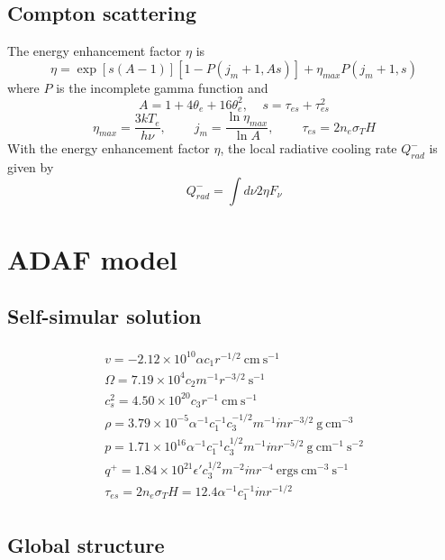 \documentclass[12pt]{book}
\begin{document}
\subsection{Compton scattering}
The energy enhancement factor $\eta$ is
\begin{equation}
 \eta=\exp[s(A-1)][1-P(j_m+1,As)]+\eta_{max}P(j_m+1,s)
\end{equation}
where $P$ is the incomplete gamma function and
\begin{equation}
 A=1+4\theta_e+16\theta_e^2,~~~~~s=\tau_{es}+\tau_{es}^2
\end{equation}
\begin{equation}
 \eta_{max}=\frac{3kT_e}{h\nu},~~~~~~~~~~j_m=\frac{\ln\eta_{max}}{\ln A},
~~~~~~~~~~\tau_{es}=2n_e\sigma_TH
\end{equation}
With the energy enhancement factor $\eta$, the local radiative cooling rate $Q_{rad}^{-}$ is given by
\begin{equation}
Q_{rad}^{-}=\int d\nu 2\eta F_\nu
\end{equation}

\section{ADAF model}
\subsection{Self-simular solution}
\begin{eqnarray}
\begin{array}{c}
v=-2.12\times 10^10\alpha c_1r^{-1/2} ~\mathrm{cm~s^{-1}}\\
\Omega=7.19\times 10^4c_2 m^{-1}r^{-3/2} ~\mathrm{s^{-1}}\\
c_s^2=4.50\times 10^{20}c_3r^{-1} ~\mathrm{cm ~s^{-1}}\\
\rho=3.79\times 10^{-5}\alpha^{-1}c_1^{-1}c_3^{-1/2}m^{-1}\dot{m}r^{-3/2} ~\mathrm{g ~cm^{-3}}\\
p=1.71\times 10^{16}\alpha^{-1}c_1^{-1}c_3^{1/2}m^{-1}\dot{m}r^{-5/2}~\mathrm{g~ cm^{-1}~s^{-2}}\\
q^+=1.84\times 10^{21}\epsilon'c_3^{1/2}m^{-2}\dot{m}r^{-4}~\mathrm{ergs~ cm^{-3}~s^{-1}}\\
\tau_{es}=2n_e\sigma_TH=12.4\alpha^{-1}c_1^{-1}\dot{m}r^{-1/2}
\end{array}
\end{eqnarray}
\subsection{Global structure}
\end{document}
